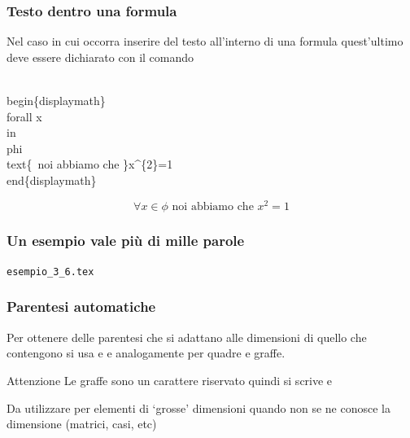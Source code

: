 \documentclass[svgnames,%
	ucs,%
	pdftex]{guitbeamer}
\begin{document}
\begin{frame}
  \frametitle{Testo dentro una formula}
	Nel caso in cui occorra inserire del testo all'interno di una formula quest'ultimo deve essere dichiarato con il comando 
 	\begin{LaTeXcode}
		\\begin\{displaymath\}\n
		\hspace*{5ex}\\forall x\\in\\phi\alert{\\text\{oi abbiamo che \}}x\textasciicircum\{2\}=1\n
		\\end\{displaymath\} 
 	\end{LaTeXcode}
	\begin{LaTeXoutput}
		\begin{displaymath} 
			\forall x\in\phi\text{ noi abbiamo che } x^{2}=1
		\end{displaymath} 
	\end{LaTeXoutput}
\end{frame}
\begin{frame}
  \frametitle{Un esempio vale pi\`u di mille parole}
	\begin{center}
		\alert{\texttt{esempio\_3\_6.tex}}
	\end{center}
\end{frame}
\begin{frame}
  \frametitle{Parentesi automatiche}
	Per ottenere delle parentesi che si adattano alle dimensioni di quello che contengono si usa  e  e analogamente per quadre e graffe.
	\begin{block}{Attenzione}
		Le graffe sono un carattere riservato quindi si scrive  e 
	\end{block}
  \bigskip
	Da utilizzare per elementi di `grosse' dimensioni quando non se ne conosce la dimensione (matrici, casi, etc)
\end{frame}
\end{document}
